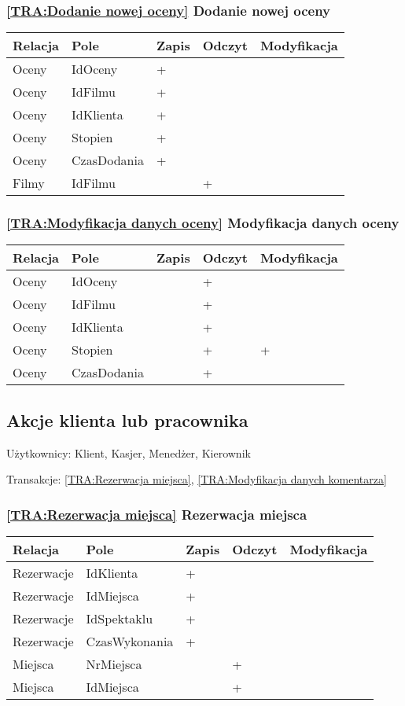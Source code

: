 \subsubsection*{\ref{TRA:Dodanie nowej oceny} Dodanie nowej oceny}
\begin{tabularx}{\textwidth}{|Y|Y|Y|Y|Y|}\hline
Relacja & Pole & Zapis & Odczyt & Modyfikacja \\\hline
Oceny & IdOceny & + &  & \\
Oceny & IdFilmu & + &  & \\
Oceny & IdKlienta & + &  & \\
Oceny & Stopien & + &  & \\
Oceny & CzasDodania & + &  & \\
Filmy & IdFilmu &  & + & \\
\hline\end{tabularx}
\subsubsection*{\ref{TRA:Modyfikacja danych oceny} Modyfikacja danych oceny}
\begin{tabularx}{\textwidth}{|Y|Y|Y|Y|Y|}\hline
Relacja & Pole & Zapis & Odczyt & Modyfikacja \\\hline
Oceny & IdOceny &  & + & \\
Oceny & IdFilmu &  & + & \\
Oceny & IdKlienta &  & + & \\
Oceny & Stopien &  & + & +\\
Oceny & CzasDodania &  & + & \\
\hline\end{tabularx}
\subsection{Akcje klienta lub pracownika}
Użytkownicy: Klient, Kasjer, Menedżer, Kierownik

Transakcje: \ref{TRA:Rezerwacja miejsca}, \ref{TRA:Modyfikacja danych komentarza}
\subsubsection*{\ref{TRA:Rezerwacja miejsca} Rezerwacja miejsca}
\begin{tabularx}{\textwidth}{|Y|Y|Y|Y|Y|}\hline
Relacja & Pole & Zapis & Odczyt & Modyfikacja \\\hline
Rezerwacje & IdKlienta & + &  & \\
Rezerwacje & IdMiejsca & + &  & \\
Rezerwacje & IdSpektaklu & + &  & \\
Rezerwacje & CzasWykonania & + &  & \\
Miejsca & NrMiejsca &  & + & \\
Miejsca & IdMiejsca &  & + & \\
\hline\end{tabularx}
